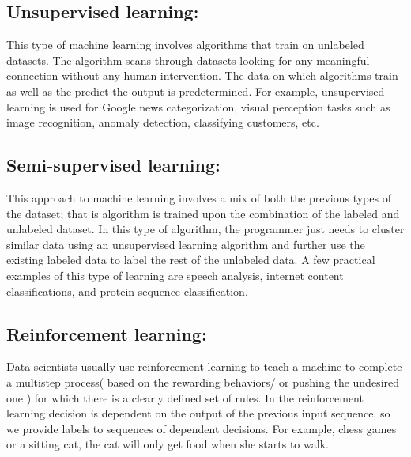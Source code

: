 \subsection{Unsupervised learning:}
This type of machine learning involves algorithms that train on unlabeled datasets. The algorithm scans through datasets looking for any meaningful connection without any human intervention. The data on which algorithms train as well as the predict the output is predetermined. For example, unsupervised learning is used for Google news categorization, visual perception tasks such as image recognition, anomaly detection, classifying customers, etc.

\subsection{Semi-supervised learning:}
This approach to machine learning involves a mix of both the previous types of the dataset; that is algorithm is trained upon the combination of the labeled and unlabeled dataset.  In this type of algorithm, the programmer just needs to cluster similar data using an unsupervised learning algorithm and further use the existing labeled data to label the rest of the unlabeled data. A few practical examples of this type of learning are speech analysis, internet content classifications, and protein sequence classification.


\subsection{Reinforcement learning: }
Data scientists usually use reinforcement learning to teach a machine to complete a multistep process( based on the rewarding behaviors/ or pushing the undesired one ) for which there is a clearly defined set of rules. In the reinforcement learning decision is dependent on the output of the previous input sequence, so we provide labels to sequences of dependent decisions. For example, chess games or a sitting cat, the cat will only get food when she starts to walk.\\

